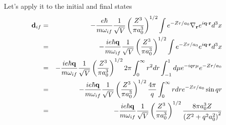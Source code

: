 Let's apply it to the initial and final states
\begin{eqnarray}
{\bf d}_{if} &=& -\frac{e\hbar}{m \omega_{if}} \frac{1}{\sqrt{V}} \left ( \frac{Z^3}{\pi a_0^3} \right )^{1/2}\int  
  e^{-Zr/a_0} \nabla_{\bf r} e^{i {\bf q}\cdot {\bf r}} d^3 x \\
  &=& -\frac{i e\hbar {\bf q} }{m \omega_{if}} \frac{1}{\sqrt{V}} \left ( \frac{Z^3}{\pi a_0^3} \right )^{1/2}\int  
  e^{-Zr/a_0} e^{i {\bf q}\cdot {\bf r}} d^3 x \\
&=& -\frac{ie \hbar {\bf q}}{m \omega_{if}} \frac{1}{\sqrt{V}} \left ( \frac{Z^3}{\pi a_0^3} \right )^{1/2}2\pi \int_0^\infty r^2 dr \int_{-1}^1
 d \mu e^{-i q r \mu} e^{-Zr/a_0} \\
&=& -\frac{i e \hbar {\bf q}}{m \omega_{if}} \frac{1}{\sqrt{V}} \left ( \frac{Z^3}{\pi
  a_0^3} \right )^{1/2}\frac{4\pi}{q} \int_0^\infty r dr e^{-Zr/a_0}
  \sin qr  \\
&=& -\frac{i e\hbar {\bf q}}{m \omega_{if}} \frac{1}{\sqrt{V}} \left ( \frac{Z^3}{\pi
  a_0^3} \right )^{1/2} \frac{8\pi a_0^3 Z}{\left (Z^2 + q^2 a_0^2\right)^2} 
\label{eq:551}
\end{eqnarray}
\label{eq:552}
\label{eq:553}
